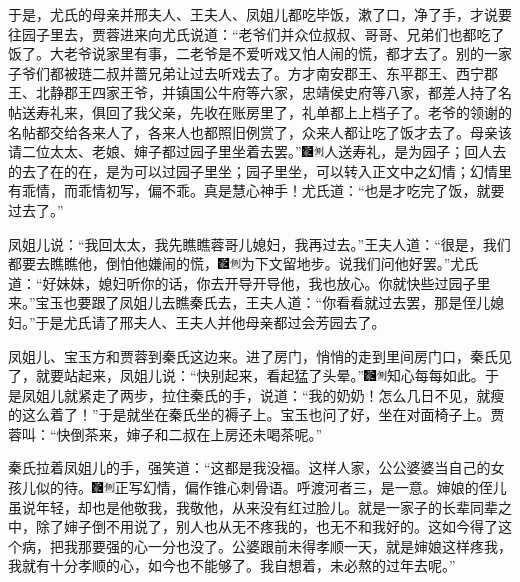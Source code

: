 于是，尤氏的母亲并邢夫人、王夫人、凤姐儿都吃毕饭，漱了口，净了手，才说要往园子里去，贾蓉进来向尤氏说道：``老爷们并众位叔叔、哥哥、兄弟们也都吃了饭了。大老爷说家里有事，二老爷是不爱听戏又怕人闹的慌，都才去了。别的一家子爷们都被琏二叔并蔷兄弟让过去听戏去了。方才南安郡王、东平郡王、西宁郡王、北静郡王四家王爷，并镇国公牛府等六家，忠靖侯史府等八家，都差人持了名帖送寿礼来，俱回了我父亲，先收在账房里了，礼单都上上档子了。老爷的领谢的名帖都交给各来人了，各来人也都照旧例赏了，众来人都让吃了饭才去了。母亲该请二位太太、老娘、婶子都过园子里坐着去罢。''{\includegraphics[width=3mm]{../Images/00006}\includegraphics[width=3mm]{../Images/00011}\footnotesize \kaishu 人送寿礼，是为园子；回人去的去了在的在，是为可以过园子里坐；园子里坐，可以转入正文中之幻情；幻情里有乖情，而乖情初写，偏不乖。真是慧心神手！}尤氏道：``也是才吃完了饭，就要过去了。''

凤姐儿说：``我回太太，我先瞧瞧蓉哥儿媳妇，我再过去。''王夫人道：``很是，我们都要去瞧瞧他，倒怕他嫌闹的慌，{\includegraphics[width=3mm]{../Images/00006}\includegraphics[width=3mm]{../Images/00011}\footnotesize \kaishu 为下文留地步。}说我们问他好罢。''尤氏道：``好妹妹，媳妇听你的话，你去开导开导他，我也放心。你就快些过园子里来。''宝玉也要跟了凤姐儿去瞧秦氏去，王夫人道：``你看看就过去罢，那是侄儿媳妇。''于是尤氏请了邢夫人、王夫人并他母亲都过会芳园去了。

凤姐儿、宝玉方和贾蓉到秦氏这边来。进了房门，悄悄的走到里间房门口，秦氏见了，就要站起来，凤姐儿说：``快别起来，看起猛了头晕。''{\includegraphics[width=3mm]{../Images/00006}\includegraphics[width=3mm]{../Images/00011}\footnotesize \kaishu 知心每每如此。}于是凤姐儿就紧走了两步，拉住秦氏的手，说道：``我的奶奶！怎么几日不见，就瘦的这么着了！''于是就坐在秦氏坐的褥子上。宝玉也问了好，坐在对面椅子上。贾蓉叫：``快倒茶来，婶子和二叔在上房还未喝茶呢。''

秦氏拉着凤姐儿的手，强笑道：``这都是我没福。这样人家，公公婆婆当自己的女孩儿似的待。{\includegraphics[width=3mm]{../Images/00006}\includegraphics[width=3mm]{../Images/00011}\footnotesize \kaishu 正写幻情，偏作锥心刺骨语。呼渡河者三，是一意。}婶娘的侄儿虽说年轻，却也是他敬我，我敬他，从来没有红过脸儿。就是一家子的长辈同辈之中，除了婶子倒不用说了，别人也从无不疼我的，也无不和我好的。这如今得了这个病，把我那要强的心一分也没了。公婆跟前未得孝顺一天，就是婶娘这样疼我，我就有十分孝顺的心，如今也不能够了。我自想着，未必熬的过年去呢。''


